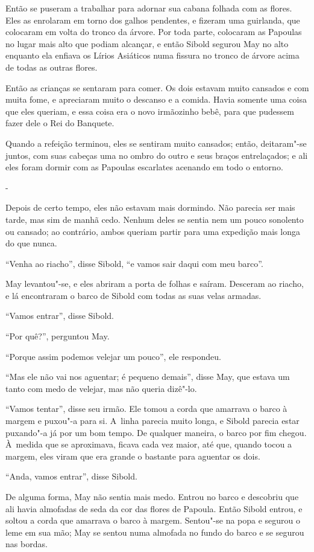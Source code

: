 Então se puseram a trabalhar para adornar sua cabana folhada com as
flores. Eles as enrolaram em torno dos galhos pendentes, e fizeram uma
guirlanda, que colocaram em volta do tronco da árvore. Por toda parte,
colocaram as Papoulas no lugar mais alto que podiam alcançar, e então
Sibold segurou May no alto enquanto ela enfiava os Lírios Asiáticos numa
fissura no tronco de árvore acima de todas as outras flores.

Então as crianças se sentaram para comer. Os dois estavam muito cansados
e com muita fome, e apreciaram muito o descanso e a comida. Havia
somente uma coisa que eles queriam, e essa coisa era o novo irmãozinho
bebê, para que pudessem fazer dele o Rei do Banquete.

Quando a refeição terminou, eles se sentiram muito cansados; então,
deitaram"-se juntos, com suas cabeças uma no ombro do outro e seus braços
entrelaçados; e ali eles foram dormir com as Papoulas escarlates
acenando em todo o entorno.

-

Depois de certo tempo, eles não estavam mais dormindo. Não parecia ser
mais tarde, mas sim de manhã cedo. Nenhum deles se sentia nem um pouco
sonolento ou cansado; ao contrário, ambos queriam partir para uma
expedição mais longa do que nunca.

``Venha ao riacho'', disse Sibold, ``e vamos sair daqui com meu barco''.

May levantou"-se, e eles abriram a porta de folhas e saíram. Desceram ao
riacho, e lá encontraram o barco de Sibold com todas as suas velas
armadas.

``Vamos entrar'', disse Sibold.

``Por quê?'', perguntou May.

``Porque assim podemos velejar um pouco'', ele respondeu.

``Mas ele não vai nos aguentar; é pequeno demais'', disse May, que
estava um tanto com medo de velejar, mas não queria dizê"-lo.

``Vamos tentar'', disse seu irmão. Ele tomou a corda que amarrava o
barco à margem e puxou"-a para si. A~linha parecia muito longa, e Sibold
parecia estar puxando"-a já por um bom tempo. De qualquer maneira, o
barco por fim chegou. À~medida que se aproximava, ficava cada vez maior,
até que, quando tocou a margem, eles viram que era grande o bastante
para aguentar os dois.

``Anda, vamos entrar'', disse Sibold.

De alguma forma, May não sentia mais medo. Entrou no barco e descobriu
que ali havia almofadas de seda da cor das flores de Papoula. Então
Sibold entrou, e soltou a corda que amarrava o barco à margem. Sentou"-se
na popa e segurou o leme em sua mão; May se sentou numa almofada no
fundo do barco e se segurou nas bordas.

